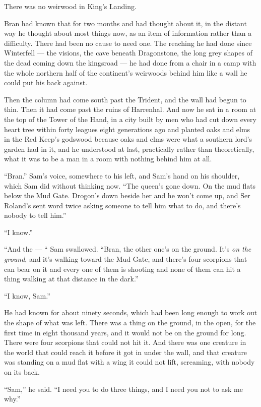 There was no weirwood in King’s Landing.

Bran had known that for two months and had thought about it, in the distant way he thought about most things now, as an item of information rather than a difficulty. There had been no cause to need one. The reaching he had done since Winterfell — the visions, the cave beneath Dragonstone, the long grey shapes of the dead coming down the kingsroad — he had done from a chair in a camp with the whole northern half of the continent’s weirwoods behind him like a wall he could put his back against.

Then the column had come south past the Trident, and the wall had begun to thin. Then it had come past the ruins of Harrenhal. And now he sat in a room at the top of the Tower of the Hand, in a city built by men who had cut down every heart tree within forty leagues eight generations ago and planted oaks and elms in the Red Keep’s godswood because oaks and elms were what a southern lord’s garden had in it, and he understood at last, practically rather than theoretically, what it was to be a man in a room with nothing behind him at all.

“Bran.” Sam’s voice, somewhere to his left, and Sam’s hand on his shoulder, which Sam did without thinking now. “The queen’s gone down. On the mud flats below the Mud Gate. Drogon’s down beside her and he won’t come up, and Ser Roland’s sent word twice asking someone to tell him what to do, and there’s nobody to tell him.”

“I know.”

“And the — “ Sam swallowed. “Bran, the other one’s on the ground. It’s \textit{on the ground}, and it’s walking toward the Mud Gate, and there’s four scorpions that can bear on it and every one of them is shooting and none of them can hit a thing walking at that distance in the dark.”

“I know, Sam.”

He had known for about ninety seconds, which had been long enough to work out the shape of what was left. There was a thing on the ground, in the open, for the first time in eight thousand years, and it would not be on the ground for long. There were four scorpions that could not hit it. And there was one creature in the world that could reach it before it got in under the wall, and that creature was standing on a mud flat with a wing it could not lift, screaming, with nobody on its back.

“Sam,” he said. “I need you to do three things, and I need you not to ask me why.”

